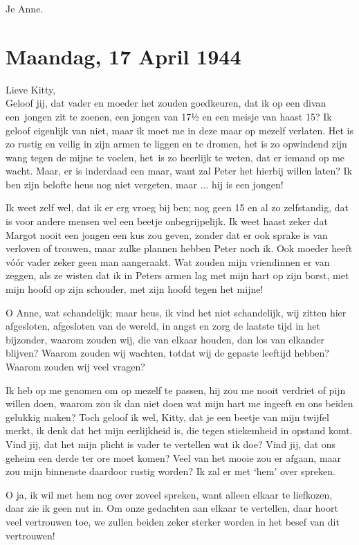 \documentclass{book}
\begin{document}
Je Anne.

\section*{Maandag, 17 April 1944}

Lieve Kitty,\\
Geloof jij, dat vader en moeder het zouden goedkeuren, dat ik op
een divan een~jongen zit te zoenen, een jongen van 171⁄2 en een meisje van haast
15? Ik geloof eigenlijk van niet, maar ik moet me in deze maar op mezelf
verlaten. Het is zo rustig en veilig in zijn armen te liggen en te dromen, het
is zo opwindend zijn wang tegen de mijne te voelen, het~is zo heerlijk te weten,
dat er iemand op me wacht. Maar, er is inderdaad een maar, want zal Peter het
hierbij willen laten? Ik ben zijn belofte heus nog niet vergeten, maar ... hij
is een jongen!

Ik weet zelf wel, dat ik er erg vroeg bij ben; nog geen 15 en al zo zelfstandig,
dat is voor andere mensen wel een beetje onbegrijpelijk. Ik weet haast zeker dat
Margot nooit een jongen een kus zou geven, zonder dat er ook sprake is van
verloven of trouwen, maar zulke plannen hebben Peter noch ik. Ook moeder heeft
vóór vader zeker geen man aangeraakt.  Wat zouden mijn vriendinnen er van
zeggen, als ze wisten dat ik in Peters armen lag met mijn hart op zijn borst,
met mijn hoofd op zijn schouder, met zijn hoofd tegen het mijne!

O Anne, wat schandelijk; maar heus, ik vind het niet schandelijk, wij zitten
hier afgesloten, afgesloten van de wereld, in angst en zorg de laatste tijd in
het bijzonder, waarom zouden wij, die van elkaar houden, dan los van elkander
blijven? Waarom zouden wij wachten, totdat wij de gepaste leeftijd hebben?
Waarom zouden wij veel vragen?

Ik heb op me genomen om op mezelf te passen, hij zou me nooit verdriet of pijn
willen doen, waarom zou ik dan niet doen wat mijn hart me ingeeft en ons beiden
gelukkig maken? Toch geloof ik wel, Kitty, dat je een beetje van mijn twijfel
merkt, ik denk dat het mijn eerlijkheid is, die tegen stiekemheid in opstand
komt. Vind jij, dat het mijn plicht is vader te vertellen wat ik doe? Vind jij,
dat ons geheim een derde ter ore moet komen? Veel van het mooie zou er afgaan,
maar zou mijn binnenste daardoor rustig worden? Ik zal er met `hem' over
spreken.

O ja, ik wil met hem nog over zoveel spreken, want alleen elkaar te liefkozen,
daar zie ik geen nut in. Om onze gedachten aan elkaar te vertellen, daar hoort
veel vertrouwen toe, we zullen beiden zeker sterker worden in het besef van dit
vertrouwen!
\end{document}
